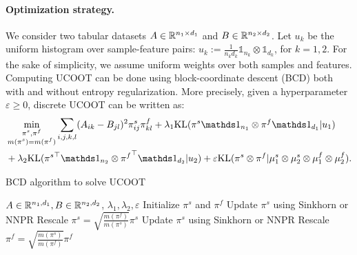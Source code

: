 \paragraph{Optimization strategy.}
We consider two tabular datasets $A \in \mathbb R^{n_1 \times d_1}$ and $B \in \mathbb R^{n_2 \times d_2}$.
Let $u_k$ be the uniform histogram over sample-feature pairs:
$u_k := \frac{1}{n_kd_k}\mathds 1_{n_k} \otimes \mathds 1_{d_k}$, for $k=1, 2$.
For the sake of simplicity, we assume uniform weights over both samples and features.
Computing UCOOT can be done using block-coordinate descent (BCD) both with
and without entropy regularization. More precisely, given a hyperparameter $\varepsilon \geq 0$,
discrete UCOOT can be written as:
\begin{equation}
\begin{split}
    \label{eq:ucoot-discrete-2}
  &\min_{\substack{\pi^s, \pi^f \\
  \iffalse \in \bbR_+^{n_1, n_2} \\ \pi^f \in \bbR_+^{d_1, d_2} \\ \fi m(\pi^s) = m(\pi^f)}}
  \sum_{i, j, k, l} (A_{ik} - B_{jl})^2\pi^s_{ij}\pi^f_{kl} +
  \lambda_1 \kl(\pi^s \mathds 1_{n_1} \otimes \pi^f \mathds 1_{d_1} | u_1 )  \\
  &+ \lambda_2 \kl({\pi^s}^\top \mathds 1_{n_2} \otimes {\pi^f}^{\top} \mathds 1_{d_2} | u_2) +
  \varepsilon \text{KL}( \pi^s \otimes \pi^f | \mu^s_1 \otimes \mu_2^s \otimes \mu_1^f \otimes \mu_2^f).
\end{split}
\end{equation}

\begin{algorithm}
    \caption{BCD algorithm to solve UCOOT \label{alg:bcd}}
    \begin{algorithmic}
       $A \in \mathbb R^{n_1, d_1}, B \in \mathbb R^{n_2, d_2}$, $\lambda_1, \lambda_2, \varepsilon$
      \STATE Initialize $\pi^s$ and $\pi^f$
      \REPEAT
      \STATE Update $\pi^s$ using Sinkhorn or NNPR
      \STATE Rescale $\pi^s = \sqrt{\frac{m(\pi^f)}{m(\pi^s)}} \pi^s$
      \STATE Update $\pi^s$ using Sinkhorn or NNPR
      \STATE Rescale $\pi^f = \sqrt{\frac{m(\pi^s)}{m(\pi^f)}} \pi^f$
	\end{algorithmic}
\end{algorithm}

